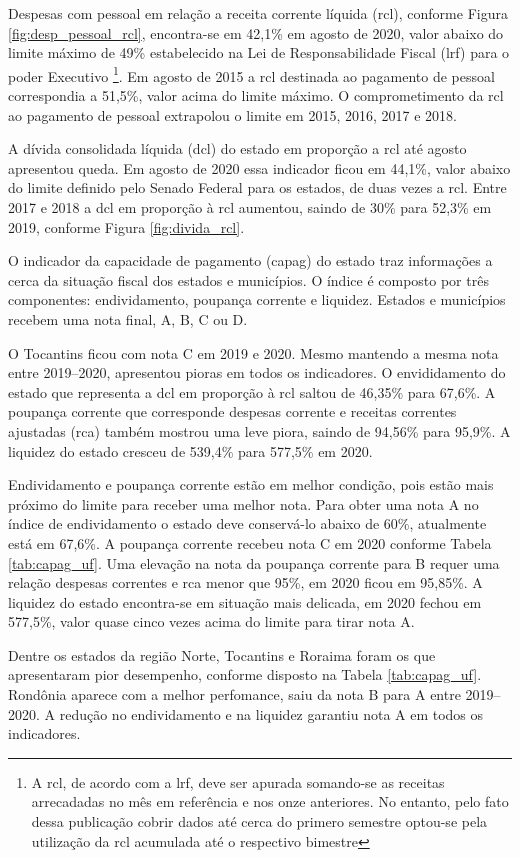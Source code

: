 \documentclass[twocolumn, a4paper, 10pt]{report}
\begin{document}
    Despesas com pessoal em relação a receita corrente líquida
    (\acrshort{rcl}), conforme Figura \ref{fig:desp_pessoal_rcl},
    encontra-se em 42,1\% em agosto de 2020, valor abaixo do limite
    máximo de 49\% estabelecido na Lei de Responsabilidade Fiscal
    (\acrshort{lrf}) para o poder Executivo \footnote{A \acrshort{rcl},
      de acordo com a \acrshort{lrf}, deve ser apurada somando-se as
      receitas arrecadadas no mês em referência e nos onze anteriores.
      No entanto, pelo fato dessa publicação cobrir dados até cerca do
      primero semestre optou-se pela utilização da \acrshort{rcl}
      acumulada até o respectivo bimestre}. Em agosto de 2015 a
    \acrshort{rcl} destinada ao pagamento de pessoal correspondia a
    51,5\%, valor acima do limite máximo. O comprometimento da
    \acrshort{rcl} ao pagamento de pessoal extrapolou o limite em 2015,
    2016, 2017 e 2018.

    A dívida consolidada líquida (\acrshort{dcl}) do estado em proporção
    a \acrshort{rcl} até agosto apresentou queda. Em agosto de 2020 essa
    indicador ficou em 44,1\%, valor abaixo do limite definido pelo
    Senado Federal para os estados, de duas vezes a \acrshort{rcl}.
    Entre 2017 e 2018 a \acrshort{dcl} em proporção à \acrshort{rcl}
    aumentou, saindo de 30\% para 52,3\% em 2019, conforme Figura
    \ref{fig:divida_rcl}.

    O indicador da capacidade de pagamento (\acrshort{capag}) do estado
    traz informações a cerca da situação fiscal dos estados e
    municípios. O índice é composto por três componentes: endividamento,
    poupança corrente e liquidez. Estados e municípios recebem uma nota
    final, A, B, C ou D.

    O Tocantins ficou com nota C em 2019 e 2020. Mesmo mantendo a mesma
    nota entre 2019--2020, apresentou pioras em todos os indicadores. O
    envididamento do estado que representa a \acrshort{dcl} em proporção
    à \acrshort{rcl} saltou de 46,35\% para 67,6\%. A poupança corrente
    que corresponde despesas corrente e receitas correntes ajustadas
    (\acrshort{rca}) também mostrou uma leve piora, saindo de 94,56\%
    para 95,9\%. A liquidez do estado cresceu de 539,4\% para 577,5\% em
    2020.

    Endividamento e poupança corrente estão em melhor condição, pois
    estão mais próximo do limite para receber uma melhor nota. Para
    obter uma nota A no índice de endividamento o estado deve
    conservá-lo abaixo de 60\%, atualmente está em 67,6\%. A poupança
    corrente recebeu nota C em 2020 conforme Tabela \ref{tab:capag_uf}.
    Uma elevação na nota da poupança corrente para B requer uma relação
    despesas correntes e \acrshort{rca} menor que 95\%, em 2020 ficou em
    95,85\%. A liquidez do estado encontra-se em situação mais delicada,
    em 2020 fechou em 577,5\%, valor quase cinco vezes acima do limite
    para tirar nota A.

    Dentre os estados da região Norte, Tocantins e Roraima foram os que
    apresentaram pior desempenho, conforme disposto na Tabela
    \ref{tab:capag_uf}. Rondônia aparece com a melhor perfomance, saiu
    da nota B para A entre 2019--2020. A redução no endividamento e na
    liquidez garantiu nota A em todos os indicadores.

    
\end{document}
